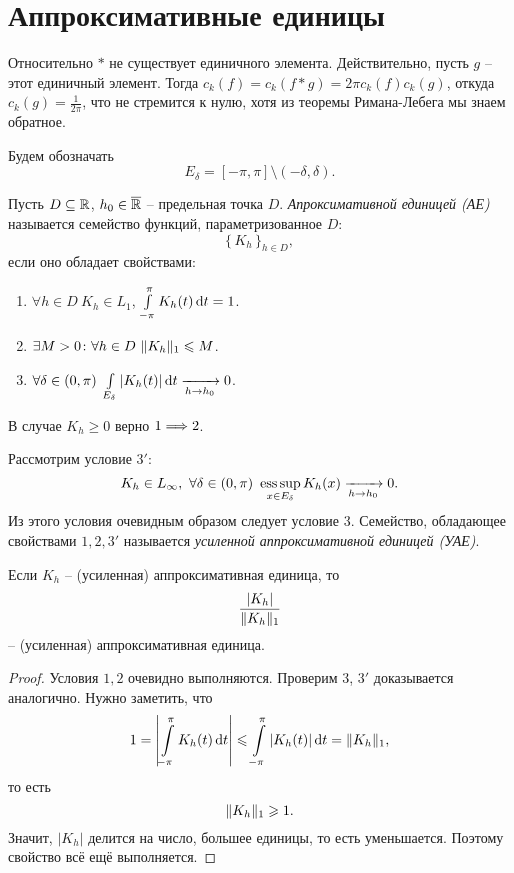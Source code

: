 \section{Аппроксимативные единицы}

\begin{remark}
    Относительно $\ast$ не существует единичного элемента. Действительно,
    пусть $g$ -- этот единичный элемент. Тогда $c_k(f) = c_k(f \ast g) = 2\pi c_k(f) c_k(g)$,
    откуда $c_k(g) = \frac{1}{2 \pi}$, что не стремится к нулю, хотя из теоремы
    Римана-Лебега мы знаем обратное.
\end{remark}

\begin{definition}
    Будем обозначать
    \[
        E_\delta = [-\pi, \pi] \setminus (-\delta, \delta)
    .\]
\end{definition}

\begin{definition}
    Пусть $D \subseteq \R$, $h_0 \in \Rbar$ -- предельная точка $D$. \textit{
    Апроксимативной единицей (АЕ)} называется семейство функций, параметризованное
    $D$:
    \[
        \{\,K_h\,\}_{h \in D}
    ,\]
    если оно обладает свойствами:
    \begin{enumerate}
        \item $\forall h \in D~ K_h \in L_1$, $\intl_{-\pi}^\pi{K_h(t) \dd t} = 1$.
        \item $\exists M > 0\colon \forall h \in D~ \norm{K_h}_1 \leqslant M$.
        \item $\forall \delta \in (0, \pi)~ \intl_{E_\delta}{|K_h(t)| \dd t} 
            \xrightarrow[h \to h_0]{} 0$.
    \end{enumerate}
\end{definition}

\begin{remark}
    В случае $K_h \geqslant 0$ верно $1 \Lra 2$.
\end{remark}

\begin{definition}
    Рассмотрим условие $3'$:
    \[
        K_h \in L_\infty,~ \forall \delta \in (0, \pi)~ \esssup_{x \in E_\delta}
        {K_h(x)} \xrightarrow[h \to h_0]{} 0
    .\]
    Из этого условия очевидным образом следует условие $3$. Семейство,
    обладающее свойствами $1, 2, 3'$ называется \textit{усиленной
    аппроксимативной единицей (УАЕ)}.
\end{definition}

\begin{remark}
    Если $K_h$ -- (усиленная) аппроксимативная единица, то
    \[
        \frac{|K_h|}{\norm{K_h}_1}
    \]
    -- (усиленная) аппроксимативная единица.
\end{remark}
\begin{proof}
    Условия $1, 2$ очевидно выполняются. Проверим $3$, $3'$ доказывается аналогично.
    Нужно заметить, что
    \[
        1 = \abs*{\intl_{-\pi}^\pi{K_h(t) \dd t}} \leqslant \intl_{-\pi}^\pi{|K_h(t)| \dd t}
        = \norm{K_h}_1
    ,\]
    то есть
    \[
        \norm{K_h}_1 \geqslant 1 
    .\]
    Значит, $|K_h|$ делится на число, большее единицы, то есть уменьшается.
    Поэтому свойство всё ещё выполняется.
\end{proof}

